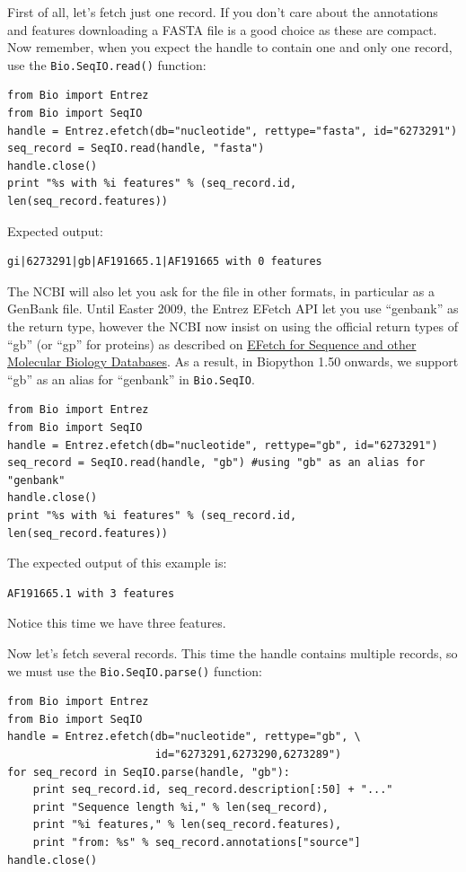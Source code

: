 \documentclass{report}
\begin{document}
First of all, let's fetch just one record.  If you don't care about the
annotations and features downloading a FASTA file is a good choice as these
are compact.  Now remember, when you expect the handle to contain one and
only one record, use the \verb|Bio.SeqIO.read()| function:

\begin{verbatim}
from Bio import Entrez
from Bio import SeqIO
handle = Entrez.efetch(db="nucleotide", rettype="fasta", id="6273291")
seq_record = SeqIO.read(handle, "fasta")
handle.close()
print "%s with %i features" % (seq_record.id, len(seq_record.features))
\end{verbatim}

\noindent Expected output:

\begin{verbatim}
gi|6273291|gb|AF191665.1|AF191665 with 0 features
\end{verbatim}

The NCBI will also let you ask for the file in other formats, in particular as
a GenBank file. Until Easter 2009, the Entrez EFetch API let you use ``genbank''
as the return type, however the NCBI now insist on using the official
return types of ``gb'' (or ``gp'' for proteins) as described on
\href{http://www.ncbi.nlm.nih.gov/entrez/query/static/efetchseq_help.html}
{EFetch for Sequence and other Molecular Biology Databases}.
As a result, in Biopython 1.50 onwards, we support ``gb'' as an
alias for ``genbank'' in \verb|Bio.SeqIO|.

\begin{verbatim}
from Bio import Entrez
from Bio import SeqIO
handle = Entrez.efetch(db="nucleotide", rettype="gb", id="6273291")
seq_record = SeqIO.read(handle, "gb") #using "gb" as an alias for "genbank"
handle.close()
print "%s with %i features" % (seq_record.id, len(seq_record.features))
\end{verbatim}

\noindent The expected output of this example is:

\begin{verbatim}
AF191665.1 with 3 features
\end{verbatim}

\noindent Notice this time we have three features.

Now let's fetch several records.  This time the handle contains multiple records,
so we must use the \verb|Bio.SeqIO.parse()| function:

\begin{verbatim}
from Bio import Entrez
from Bio import SeqIO
handle = Entrez.efetch(db="nucleotide", rettype="gb", \
                       id="6273291,6273290,6273289")
for seq_record in SeqIO.parse(handle, "gb"):
    print seq_record.id, seq_record.description[:50] + "..."
    print "Sequence length %i," % len(seq_record),
    print "%i features," % len(seq_record.features),
    print "from: %s" % seq_record.annotations["source"]
handle.close()
\end{verbatim}
\end{document}
